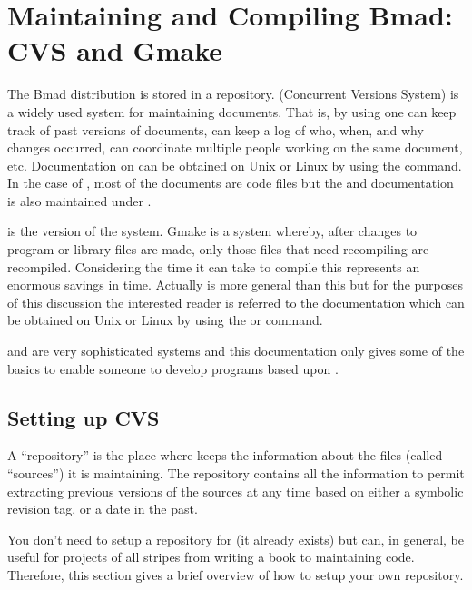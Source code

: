 \chapter{Maintaining and Compiling Bmad: CVS and Gmake}
\label{c:cvs_gmake}

The Bmad distribution is stored in a \cvs repository. \cvs
(Concurrent Versions System) is a widely used system for maintaining
documents. That is, by using \cvs one can keep track of past
versions of documents, can keep a log of who, when, and why changes
occurred, can coordinate multiple people working on the same document,
etc.  Documentation on \cvs can be obtained on Unix or Linux by
using the  command. In the case of \bmad, most of the
documents are code files but the \bmad and \tao documentation is
also maintained under \cvs.

 is the  version of the  system. Gmake is a
system whereby, after changes to program or library files are made,
only those files that need recompiling are recompiled. Considering the
time it can take to compile this represents an enormous savings in
time. Actually  is more general than this but for the
purposes of this discussion the interested reader is referred to the
 documentation which can be obtained on Unix or Linux by
using the  or  command.

\cvs and  are very sophisticated systems and this
documentation only gives some of the basics to enable someone to
develop programs based upon \bmad.

\section{Setting up CVS}
\label{s:cvs_setup}

A ``repository'' is the place where \cvs keeps the information
about the files (called ``sources'') it is maintaining. The repository
contains all the information to permit extracting previous versions of
the sources at any time based on either a symbolic revision tag, or a
date in the past.

You don't need to setup a \cvs repository for \bmad (it already
exists) but \cvs can, in general, be useful for projects of all
stripes from writing a book to maintaining code. Therefore, this
section gives a brief overview of how to setup your own \cvs
repository.


